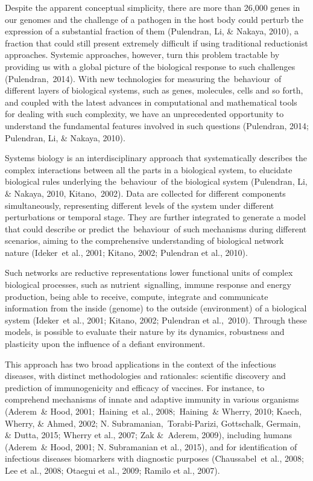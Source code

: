 \documentclass[
]{book}
\begin{document}
Despite the apparent conceptual simplicity, there are more than 26,000 genes in our genomes and the challenge of a pathogen in the host body could perturb the expression of a substantial fraction of them (Pulendran, Li, \& Nakaya, 2010)⁠, a fraction that could still present extremely difficult if using traditional reductionist approaches. Systemic approaches, however, turn this problem tractable by providing us with a global picture of the biological response to such challenges (Pulendran,~2014)⁠. With new technologies for measuring the~behaviour~of different layers of biological systems, such as genes, molecules, cells and so forth, and coupled with the latest advances in computational and mathematical tools for dealing with such complexity, we have an unprecedented opportunity to understand the fundamental features involved in such questions (Pulendran, 2014; Pulendran, Li, \& Nakaya, 2010)⁠.

Systems biology is an interdisciplinary approach that systematically describes the complex interactions between all the parts in a biological system, to elucidate biological rules underlying the~behaviour~of the biological system (Pulendran, Li, \& Nakaya, 2010, Kitano,~2002)⁠⁠. Data are collected for different components simultaneously, representing different levels of the system under different perturbations or temporal stage. They are further integrated to generate a model that could describe or predict the~behaviour~of such mechanisms during different scenarios, aiming to the comprehensive understanding of biological network nature (Ideker~et al., 2001; Kitano, 2002; Pulendran et al., 2010).

Such networks are reductive representations lower functional units of complex biological processes, such as nutrient~signalling, immune response and energy production, being able to receive, compute, integrate and communicate information from the inside (genome) to the outside (environment) of a biological system (Ideker~et al., 2001; Kitano, 2002; Pulendran et al.,~2010)⁠. Through these models, is possible to evaluate their nature by its dynamics, robustness and plasticity upon the influence of a defiant environment.

This approach has two broad applications in the context of the infectious diseases, with distinct methodologies and rationales: scientific discovery and prediction of immunogenicity and efficacy of vaccines. For instance, to comprehend mechanisms of innate and adaptive immunity in various organisms (Aderem~\& Hood, 2001;~Haining~et al., 2008;~Haining~\& Wherry, 2010; Kaech, Wherry, \& Ahmed, 2002; N. Subramanian,~Torabi-Parizi, Gottschalk, Germain, \& Dutta, 2015; Wherry et al., 2007; Zak \&~Aderem, 2009), including humans (Aderem~\& Hood, 2001; N. Subramanian et al., 2015)⁠, and for identification of infectious diseases biomarkers with diagnostic purposes (Chaussabel~et al., 2008; Lee et al., 2008; Otaegui et al., 2009; Ramilo et al., 2007).
\end{document}
